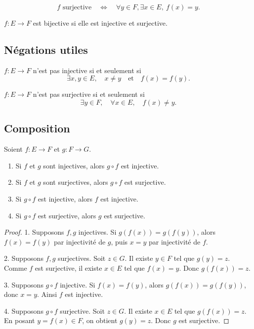 \documentclass[11pt,a4paper]{article}
\newcommand{\ssi}{\Longleftrightarrow}
\begin{document}
\begin{definitionbox}[surjectivité]
\[
f\text{ surjective}\quad\ssi\quad
\forall y\in F,\exists x\in E,\ f(x)=y.
\]
\end{definitionbox}

\begin{definitionbox}[bijectivité]
\(f:E\to F\) est bijective si elle est injective et surjective.
\end{definitionbox}

\subsection{Négations utiles}

\begin{propositionbox}
\(f:E\to F\) n'est pas injective si et seulement si
\[
\exists x,y\in E,\quad x\neq y\quad\text{et}\quad f(x)=f(y).
\]
\end{propositionbox}

\begin{propositionbox}
\(f:E\to F\) n'est pas surjective si et seulement si
\[
\exists y\in F,\quad \forall x\in E,\quad f(x)\neq y.
\]
\end{propositionbox}

\subsection{Composition}

\begin{propositionbox}
Soient \(f:E\to F\) et \(g:F\to G\).
\begin{enumerate}
    \item Si \(f\) et \(g\) sont injectives, alors \(g\circ f\) est injective.
    \item Si \(f\) et \(g\) sont surjectives, alors \(g\circ f\) est surjective.
    \item Si \(g\circ f\) est injective, alors \(f\) est injective.
    \item Si \(g\circ f\) est surjective, alors \(g\) est surjective.
\end{enumerate}
\end{propositionbox}

\begin{proof}
1. Supposons \(f,g\) injectives. Si \(g(f(x))=g(f(y))\), alors \(f(x)=f(y)\) par injectivité de \(g\), puis \(x=y\) par injectivité de \(f\).

2. Supposons \(f,g\) surjectives. Soit \(z\in G\). Il existe \(y\in F\) tel que \(g(y)=z\). Comme \(f\) est surjective, il existe \(x\in E\) tel que \(f(x)=y\). Donc \(g(f(x))=z\).

3. Supposons \(g\circ f\) injective. Si \(f(x)=f(y)\), alors \(g(f(x))=g(f(y))\), donc \(x=y\). Ainsi \(f\) est injective.

4. Supposons \(g\circ f\) surjective. Soit \(z\in G\). Il existe \(x\in E\) tel que \(g(f(x))=z\). En posant \(y=f(x)\in F\), on obtient \(g(y)=z\). Donc \(g\) est surjective.
\end{proof}
\end{document}
